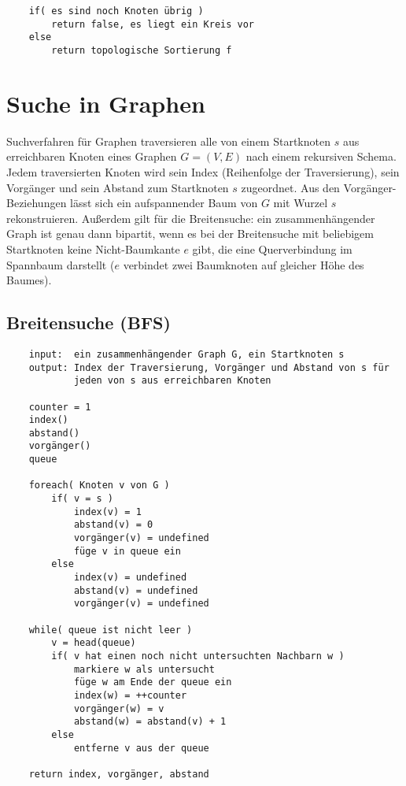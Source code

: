 \documentclass[10pt,a4paper,landscape]{article}
\begin{document}
\begin{multicols*}{2}
\begin{verbatim}
    if( es sind noch Knoten übrig )
        return false, es liegt ein Kreis vor
    else 
        return topologische Sortierung f
            \end{verbatim}

        \section{ Suche in Graphen }
            Suchverfahren für Graphen traversieren alle von einem Startknoten $s$ aus erreichbaren Knoten 
            eines Graphen $G = (V,E)$ nach einem rekursiven Schema. Jedem traversierten Knoten wird sein Index 
            (Reihenfolge der Traversierung), sein Vorgänger und sein Abstand zum Startknoten $s$ zugeordnet.
            Aus den Vorgänger-Beziehungen lässt sich ein aufspannender Baum von $G$ mit Wurzel $s$ rekonstruieren.
            \newline
            Außerdem gilt für die Breitensuche: ein zusammenhängender Graph ist genau dann bipartit, wenn es bei der Breitensuche mit beliebigem Startknoten 
            keine Nicht-Baumkante $e$ gibt, die eine Querverbindung im Spannbaum darstellt ($e$ verbindet zwei Baumknoten 
            auf gleicher Höhe des Baumes).
            \subsection*{ Breitensuche (BFS) }
            \begin{verbatim}
    input:  ein zusammenhängender Graph G, ein Startknoten s
    output: Index der Traversierung, Vorgänger und Abstand von s für 
            jeden von s aus erreichbaren Knoten
    
    counter = 1
    index()
    abstand()
    vorgänger()
    queue

    foreach( Knoten v von G )
        if( v = s )
            index(v) = 1
            abstand(v) = 0
            vorgänger(v) = undefined
            füge v in queue ein
        else
            index(v) = undefined
            abstand(v) = undefined
            vorgänger(v) = undefined

    while( queue ist nicht leer )
        v = head(queue)
        if( v hat einen noch nicht untersuchten Nachbarn w )
            markiere w als untersucht
            füge w am Ende der queue ein
            index(w) = ++counter
            vorgänger(w) = v
            abstand(w) = abstand(v) + 1
        else
            entferne v aus der queue

    return index, vorgänger, abstand
            \end{verbatim}
            

\end{multicols*}
\end{document}
